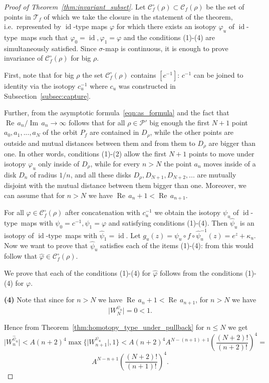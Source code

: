 \documentclass[10pt,reqno,a4paper]{amsart}
\numberwithin{figure}{section}
\numberwithin{equation}{section}
\newcommand{\idt}{of $\id$-type}
\newcommand{\id}{\operatorname{id}}
\renewcommand{\Re}{\operatorname{Re\,}}
\renewcommand{\Im}{\operatorname{Im\,}}
\newcommand{\abs}[1]{\lvert #1 \rvert}
\begin{document}
\begin{proof}[Proof of Theorem~\ref{thm:invariant_subset}]
	Let $\mathcal{C}_f^\circ(\rho)\subset\mathcal{C}_f(\rho)$ be the set of points in $\mathcal{T}_f$ of which we take the closure in the statement of the theorem, i.e.\ represented by $\id$-type maps $\varphi$ for which there exists an isotopy $\varphi_u$ \idt\ maps such that $\varphi_0=\id,\varphi_1=\varphi$ and the conditions (1)-(4) are simultaneously satisfied. Since $\sigma$-map is continuous, it is enough to prove invariance of $\mathcal{C}_f^\circ(\rho)$ for big $\rho$.
	
	First, note that for big $\rho$ the set $\mathcal{C}_f^\circ(\rho)$ contains $[c^{-1}]$: $c^{-1}$ can be joined to identity via the isotopy $c_u^{-1}$ where $c_u$ was constructed in Subsection~\ref{subsec:capture}.
	
	Further, from the asymptotic formula~\ref{eqn:as_formula} and the fact that $\Re a_n/\Im a_n\to\infty$ follows that for all $\rho\in\mathcal{P}'$ big enough the first $N+1$ point $a_0,a_1,...,a_N$ of the orbit $P_f$ are contained in $D_\rho$, while the other points are outside and mutual distances between them and from them to $D_\rho$ are bigger than one. In other words, conditions (1)-(2) allow the first $N+1$ points to move under isotopy $\varphi_u$ only inside of $D_\rho$, while for every $n>N$ the point $a_n$ moves inside of a disk $D_n$ of radius $1/n$, and all these disks $D_\rho,D_{N+1},D_{N+2},...$ are mutually disjoint with the mutual distance between them bigger than one. Moreover, we can assume that for $n>N$ we have $\Re a_n+1<\Re a_{n+1}$.
	
	For all $\varphi\in\mathcal{C}_f^\circ(\rho)$ after concatenation with $c_u^{-1}$ we obtain the isotopy $\psi_u$ \idt\ maps with $\psi_0=c^{-1},\psi_1=\varphi$ and satisfying conditions (1)-(4).  Then $\hat{\psi}_u$ is an isotopy \idt\ maps with $\hat{\psi}_1=\id$. Let $g_u(z)=\psi_u\circ f\circ\hat{\psi}_u^{-1}(z)=e^z+\kappa_u$. Now we want to prove that $\hat{\psi}_u$ satisfies each of the items (1)-(4): from this would follow that $\hat{\varphi}\in\mathcal{C}_f^\circ(\rho)$. 
	
	We prove that each of the conditions (1)-(4) for $\hat{\varphi}$ follows from the conditions (1)-(4) for $\varphi$.
	
	\textbf{(4)} Note that since for $n>N$ we have $\Re a_n+1<\Re a_{n+1}$, for $n>N$ we have $$\abs{W_N^{\psi_u}}=0<1.$$
	
	Hence from Theorem~\ref{thm:homotopy_type_under_pullback} for $n\leq N$ we get $$\abs{W_n^{\hat{\psi}_u}}<A(n+2)^4\max\{\abs{W_{n+1}^{\psi_u}},1\}<A(n+2)^4 A^{N-(n+1)+1}\left(\frac{(N+2)!}{(n+2)!}\right)^4=$$
	$$A^{N-n+1}\left(\frac{(N+2)!}{(n+1)!}\right)^4.$$
	

\end{proof}
\end{document}
